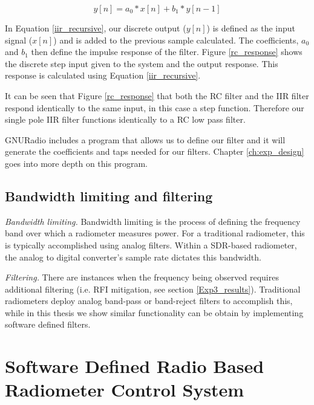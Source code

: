 \begin{equation}\label{iir_recursive}
y[n] = a_0 * x[n] + b_1 * y[n-1]
\end{equation}

In Equation \ref{iir_recursive}, our discrete output ($y[n]$) is defined as the input signal ($x[n]$) and is added to the previous sample calculated.  The coefficients, $a_0$ and $b_1$ then define the impulse response of the filter.  Figure \ref{rc_response} shows the discrete step input given to the system and the output response.  This response is calculated using Equation \ref{iir_recursive}.


It can be seen that Figure \ref{rc_response} that both the RC filter and the IIR filter respond identically to the same input, in this case a step function.  Therefore our single pole IIR filter functions identically to a RC low pass filter.  

GNURadio includes a program that allows us to define our filter and it will generate the coefficients and taps needed for our filters.  Chapter \ref{ch:exp_design} goes into more depth on this program.

\subsection{Bandwidth limiting and filtering}

\emph{Bandwidth limiting.}  Bandwidth limiting is the process of defining the frequency band over which a radiometer measures power.  For a traditional radiometer, this is typically accomplished using analog filters.  Within a SDR-based radiometer, the analog to digital converter's sample rate dictates this bandwidth.

\emph{Filtering.}  There are instances when the frequency being observed requires additional filtering (i.e. RFI mitigation, see section \ref{Exp3_results}).  Traditional radiometers deploy analog band-pass or band-reject filters to accomplish this, while in this thesis we show similar functionality can be obtain by implementing software defined filters. 

\section{Software Defined Radio Based Radiometer Control System}

